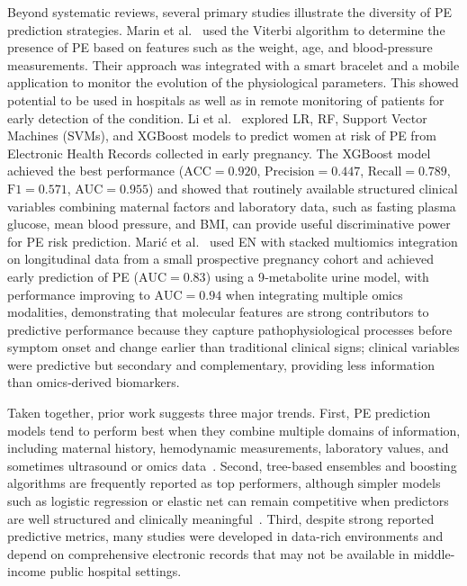 \documentclass[diagnostics,article,accept,pdftex,moreauthors]{Definitions/mdpi}
\begin{document}
Beyond systematic reviews, several primary studies illustrate the
diversity of \ac{PE} prediction strategies. Marin et
al.~\cite{marin2019} used the Viterbi algorithm to determine the
presence of \ac{PE} based on features such as the weight, age,
and blood-pressure measurements. Their approach was integrated with a
smart bracelet and a mobile application to monitor the evolution of
the physiological parameters. This showed potential to be used in
hospitals as well as in remote monitoring of patients for early
detection of the condition. Li et al.~\cite{LI2021102} explored
\ac{LR}, \ac{RF}, Support Vector Machines (SVMs), and XGBoost models to predict women at
risk of \ac{PE} from Electronic Health Records collected in early
pregnancy. The XGBoost model achieved the best performance
($\mathrm{ACC}=0.920$, $\mathrm{Precision}=0.447$, $\mathrm{Recall}=0.789$,
$\mathrm{F1}=0.571$, $\mathrm{AUC}=0.955$) and showed that routinely available
structured clinical variables combining maternal factors and
laboratory data, such as fasting plasma glucose, mean blood pressure,
and \ac{BMI}, can provide useful discriminative power for \ac{PE}
risk prediction. Mari\'{c} et al.~\cite{mari__2022} used \ac{EN} with
stacked multiomics integration on longitudinal data from a small
prospective pregnancy cohort and achieved early prediction of
\ac{PE} ($\mathrm{AUC}=0.83$) using a 9‑metabolite urine model, with
performance improving to $\mathrm{AUC}=0.94$ when integrating multiple
omics modalities, demonstrating that molecular features are strong
contributors to predictive performance because they capture
pathophysiological processes before symptom onset and change earlier
than traditional clinical signs; clinical variables were predictive
but secondary and complementary, providing less information than
omics‑derived biomarkers.

Taken together, prior work suggests three major trends. First,
\ac{PE} prediction models tend to perform best when they combine
multiple domains of information, including maternal history,
hemodynamic measurements, laboratory values, and sometimes ultrasound
or omics data~\cite{Darsareh2024,Rahman2023,mennickent_2023}. Second,
tree-based ensembles and boosting algorithms are frequently reported
as top performers, although simpler models such as logistic
regression or elastic net can remain competitive when predictors are
well structured and clinically meaningful~\cite{Darsareh2024,LI2021102,mari__2020}.
Third, despite strong reported predictive metrics, many studies
were developed in data-rich environments and depend on comprehensive
electronic records that may not be available in middle-income public
hospital settings.
\end{document}
